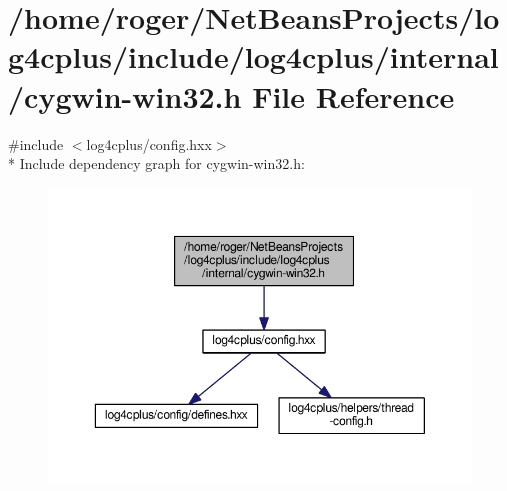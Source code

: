 \hypertarget{cygwin-win32_8h}{\section{/home/roger/\-Net\-Beans\-Projects/log4cplus/include/log4cplus/internal/cygwin-\/win32.h File Reference}
\label{cygwin-win32_8h}
}
{\ttfamily \#include $<$log4cplus/config.\-hxx$>$}\\*
Include dependency graph for cygwin-\/win32.h\-:
\nopagebreak
\begin{figure}[H]
\begin{center}
\leavevmode
\includegraphics[width=350pt]{cygwin-win32_8h__incl}
\end{center}
\end{figure}
